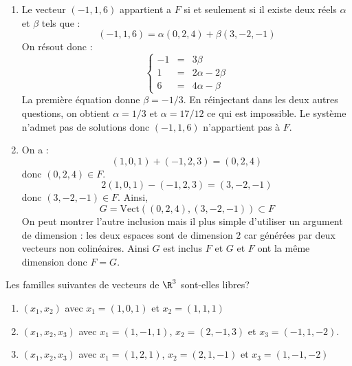 \documentclass[a4paper,10pt]{report}
\begin{document}
\corr 
\begin{enumerate}
\item Le vecteur $(-1,1,6)$ appartient a $F$ si et seulement si il existe deux réels $\alpha$ et $\beta$ tels que :
$$ (-1,1,6) = \alpha (0,2,4) + \beta (3,-2,-1)$$
On résout donc :
$$ \left\lbrace \begin{array}{ccl}
-1 & = & 3 \beta \\
1 & = & 2 \alpha - 2 \beta \\
6 & = & 4 \alpha - \beta
\end{array}\right.$$
La première équation donne $\beta = -1/3$. En réinjectant dans les deux autres questions, on obtient $\alpha=1/3$ et $\alpha = 17/12$ ce qui est impossible. Le système n'admet pas de solutions donc $(-1,1,6)$ n'appartient pas à $F$.
\item On a :
$$ (1,0,1) + (-1,2,3) =(0,2,4)$$
donc $(0,2,4) \in F$.
$$ 2(1,0,1) -(-1,2,3) = (3,-2,-1)$$
donc $(3,-2,-1) \in F$. Ainsi,
$$ G=\textrm{Vect}((0,2,4), (3,-2,-1)) \subset F$$
On peut montrer l'autre inclusion mais il plus simple d'utiliser un argument de dimension : les deux espaces sont de dimension $2$ car générées par deux vecteurs non colinéaires. Ainsi $G$ est inclus $F$ et $G$ et $F$ ont la même dimension donc $F=G$.
\end{enumerate}

\begin{Exercice}{} Les familles suivantes de vecteurs de $\R^3$ sont-elles libres?
   \begin{enumerate}
  \item
        $(x_1 ,x_2)$ avec $x_1 = (1,0,1)$ et $x_2 = (1,1,1)$
      \item
        $(x_1 ,x_2 ,x_3)$ avec $x_1 = (1, - 1,1)$, $x_2 = (2, - 1,3)$ et $x_3 = ( - 1,1, - 2)$.
      \item
        $(x_1 ,x_2 ,x_3)$ avec $x_1 = (1,2,1)$, $x_2 = (2,1, - 1)$ et $x_3 = (1, - 1, - 2)$
    \end{enumerate}
\end{Exercice}

\corr
\end{document}
